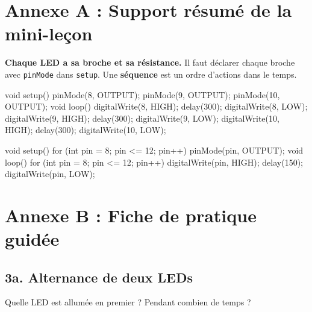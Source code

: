 \documentclass[11pt,a4paper]{article}
\begin{document}

\newpage
\section*{Annexe A : Support résumé de la mini-leçon}

\begin{tcolorbox}[colback=yellow!10,colframe=yellow!50!black]
\textbf{Chaque LED a sa broche et sa résistance.} Il faut déclarer chaque broche avec \texttt{pinMode} dans \texttt{setup}. Une \textbf{séquence} est un ordre d'actions dans le temps.
\end{tcolorbox}

\begin{arduino}
void setup() {
  pinMode(8, OUTPUT);
  pinMode(9, OUTPUT);
  pinMode(10, OUTPUT);
}
void loop() {
  digitalWrite(8, HIGH);  delay(300);  digitalWrite(8, LOW);
  digitalWrite(9, HIGH);  delay(300);  digitalWrite(9, LOW);
  digitalWrite(10, HIGH); delay(300);  digitalWrite(10, LOW);
}
\end{arduino}

\begin{arduino}
void setup() {
  for (int pin = 8; pin <= 12; pin++) {
    pinMode(pin, OUTPUT);
  }
}
void loop() {
  for (int pin = 8; pin <= 12; pin++) {
    digitalWrite(pin, HIGH);
    delay(150);
    digitalWrite(pin, LOW);
  }
}
\end{arduino}

\newpage
\section*{Annexe B : Fiche de pratique guidée}

\subsection*{3a. Alternance de deux LEDs}
Quelle LED est allumée en premier ? \dotfill\quad Pendant combien de temps ? \dotfill
\end{document}
